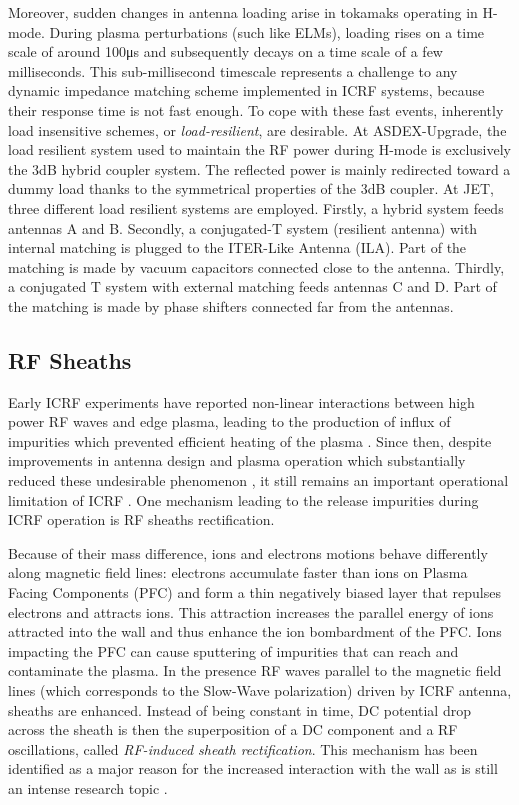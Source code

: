 Moreover, sudden changes in antenna loading arise in tokamaks operating in H-mode. During plasma perturbations (such like ELMs), loading rises on a time scale of around 100\si{\micro s} and subsequently decays on a time scale of a few milliseconds. This sub-millisecond timescale represents a challenge to any dynamic impedance matching scheme implemented in ICRF systems, because their response time is not fast enough. To cope with these fast events, inherently load insensitive schemes, or \textit{load-resilient}, are desirable. At ASDEX-Upgrade, the load resilient system used to maintain the RF power during H-mode is exclusively the 3dB hybrid coupler system. The reflected power is mainly redirected toward a dummy load thanks to the symmetrical properties of the 3dB coupler. At JET, three different load resilient systems are employed. Firstly, a hybrid system feeds antennas A and B. Secondly, a conjugated-T system (resilient antenna) with internal matching is plugged to the ITER-Like Antenna (ILA). Part of the matching is made by vacuum capacitors connected close to the antenna. Thirdly, a conjugated T system with external matching feeds antennas C and D. Part of the matching is made by phase shifters connected far from the antennas.


\subsection{RF Sheaths}\label{sec:RF_sheaths}
Early ICRF experiments have reported non-linear interactions between high power RF waves and edge plasma, leading to the production of influx of impurities which prevented efficient heating of the plasma . Since then, despite improvements in antenna design and plasma operation which substantially reduced these undesirable phenomenon , it still remains an important operational limitation of ICRF . One mechanism leading to the release impurities during ICRF operation is RF sheaths rectification. 

Because of their mass difference, ions and electrons motions behave differently along magnetic field lines: electrons accumulate faster than ions on Plasma Facing Components (PFC) and form a thin negatively biased layer that repulses electrons and attracts ions. This attraction increases the  parallel energy of ions attracted into the wall and thus enhance the ion bombardment of the PFC. Ions impacting the PFC can cause sputtering of impurities that can reach and contaminate the plasma. In the presence RF waves parallel to the magnetic field lines (which corresponds to the Slow-Wave polarization) driven by ICRF antenna, sheaths are enhanced. Instead of being constant in time, DC potential drop across the sheath is then the superposition of a DC component and a RF oscillations, called \textit{RF-induced sheath rectification}. This  mechanism has been identified as a major reason for the increased interaction with the wall as is still an intense research topic .



